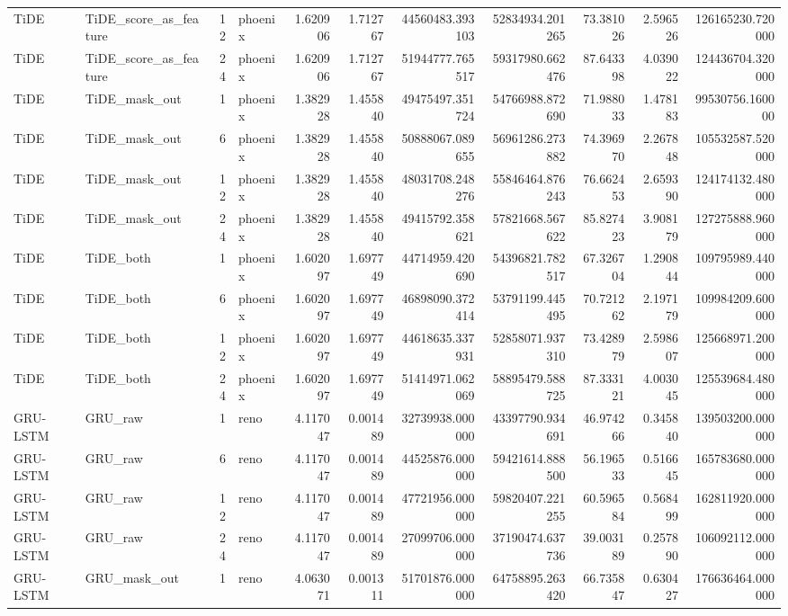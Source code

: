 \begin{longtable}{llrlrrrrrrr}
TiDE & TiDE\_score\_as\_feature & 12 & phoenix & 1.620906 & 1.712767 & 44560483.393103 & 52834934.201265 & 73.381026 & 2.596526 & 126165230.720000 \\
TiDE & TiDE\_score\_as\_feature & 24 & phoenix & 1.620906 & 1.712767 & 51944777.765517 & 59317980.662476 & 87.643398 & 4.039022 & 124436704.320000 \\
TiDE & TiDE\_mask\_out & 1 & phoenix & 1.382928 & 1.455840 & 49475497.351724 & 54766988.872690 & 71.988033 & 1.478183 & 99530756.160000 \\
TiDE & TiDE\_mask\_out & 6 & phoenix & 1.382928 & 1.455840 & 50888067.089655 & 56961286.273882 & 74.396970 & 2.267848 & 105532587.520000 \\
TiDE & TiDE\_mask\_out & 12 & phoenix & 1.382928 & 1.455840 & 48031708.248276 & 55846464.876243 & 76.662453 & 2.659390 & 124174132.480000 \\
TiDE & TiDE\_mask\_out & 24 & phoenix & 1.382928 & 1.455840 & 49415792.358621 & 57821668.567622 & 85.827423 & 3.908179 & 127275888.960000 \\
TiDE & TiDE\_both & 1 & phoenix & 1.602097 & 1.697749 & 44714959.420690 & 54396821.782517 & 67.326704 & 1.290844 & 109795989.440000 \\
TiDE & TiDE\_both & 6 & phoenix & 1.602097 & 1.697749 & 46898090.372414 & 53791199.445495 & 70.721262 & 2.197179 & 109984209.600000 \\
TiDE & TiDE\_both & 12 & phoenix & 1.602097 & 1.697749 & 44618635.337931 & 52858071.937310 & 73.428979 & 2.598607 & 125668971.200000 \\
TiDE & TiDE\_both & 24 & phoenix & 1.602097 & 1.697749 & 51414971.062069 & 58895479.588725 & 87.333121 & 4.003045 & 125539684.480000 \\
GRU-LSTM & GRU\_raw & 1 & reno & 4.117047 & 0.001489 & 32739938.000000 & 43397790.934691 & 46.974266 & 0.345840 & 139503200.000000 \\
GRU-LSTM & GRU\_raw & 6 & reno & 4.117047 & 0.001489 & 44525876.000000 & 59421614.888500 & 56.196533 & 0.516645 & 165783680.000000 \\
GRU-LSTM & GRU\_raw & 12 & reno & 4.117047 & 0.001489 & 47721956.000000 & 59820407.221255 & 60.596584 & 0.568499 & 162811920.000000 \\
GRU-LSTM & GRU\_raw & 24 & reno & 4.117047 & 0.001489 & 27099706.000000 & 37190474.637736 & 39.003189 & 0.257890 & 106092112.000000 \\
GRU-LSTM & GRU\_mask\_out & 1 & reno & 4.063071 & 0.001311 & 51701876.000000 & 64758895.263420 & 66.735847 & 0.630427 & 176636464.000000 \\

\end{longtable}
